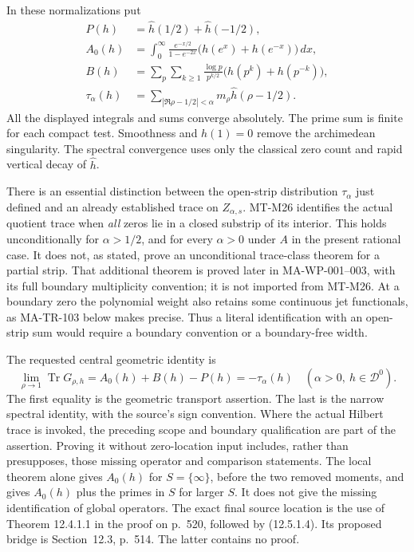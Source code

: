 In these normalizations put
\[
\begin{split}
 P(h)&=\widehat h(1/2)+\widehat h(-1/2),\\
 A_0(h)&=\int_0^\infty
   \frac{e^{-x/2}}{1-e^{-2x}}
       \bigl(h(e^x)+h(e^{-x})\bigr)\,dx,\\
 B(h)&=\sum_p\sum_{k\ge1}\frac{\log p}{p^{k/2}}
                   \bigl(h(p^k)+h(p^{-k})\bigr),\\
 \tau_\alpha(h)&=\sum_{|\Re\rho-1/2|<\alpha}
                         m_\rho\widehat h(\rho-1/2).
\end{split}
\tag{MA-TR-2}
\]
All the displayed integrals and sums converge absolutely. The prime
sum is finite for each compact test. Smoothness and $h(1)=0$ remove
the archimedean singularity. The spectral convergence uses only the
classical zero count and rapid vertical decay of $\widehat h$.

There is an essential distinction between the open-strip distribution
$\tau_\alpha$ just defined and an already established trace on
$Z_{\alpha,s}$. MT-M26 identifies the actual quotient trace when
\emph{all} zeros lie in a closed substrip of its interior. This holds
unconditionally for $\alpha>1/2$, and for every $\alpha>0$ under
$A$ in the present rational case. It does not, as stated, prove an
unconditional trace-class theorem for a partial strip. That additional theorem is proved later in MA-WP-001--003,
with its full boundary multiplicity convention; it is not
imported from MT-M26. At a boundary zero the polynomial
weight also retains some continuous jet functionals, as MA-TR-103
below makes precise. Thus a literal identification with an open-strip
sum would require a boundary convention or a boundary-free width.

The requested central geometric identity is
\[
 \boxed{\displaystyle
  \lim_{\rho\to1}\operatorname{Tr}G_{\rho,h}
     = A_0(h)+B(h)-P(h)=-\tau_\alpha(h)
       \quad(\alpha>0,\ h\in\mathcal D^0).}
 \tag{MA-TR-3}
\]
The first equality is the geometric transport assertion. The last is
the narrow spectral identity, with the source's sign convention.
Where the actual Hilbert trace is invoked, the preceding scope and
boundary qualification are part of the assertion. Proving it without
zero-location input includes, rather than presupposes, those missing
operator and comparison statements.
The local theorem alone gives $A_0(h)$ for $S=\{\infty\}$, before
the two removed moments, and gives $A_0(h)$ plus the primes in $S$
for larger $S$. It does not give the missing identification of global
operators. The exact final source location is the use of Theorem
12.4.1.1 in the proof on p.~520, followed by (12.5.1.4). Its proposed
bridge is Section~12.3, p.~514. The latter contains no proof.

